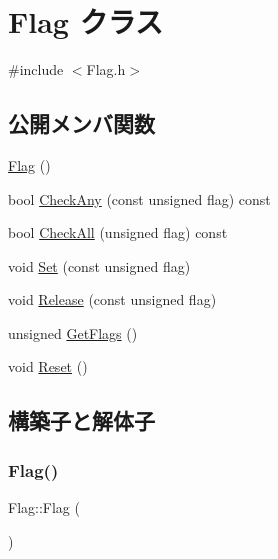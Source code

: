 \hypertarget{class_flag}{}\section{Flag クラス}
\label{class_flag}


{\ttfamily \#include $<$Flag.\+h$>$}

\subsection*{公開メンバ関数}
\begin{DoxyCompactItemize}
\item 
\mbox{\hyperlink{class_flag_a50b074239c14091f2a0dc1f52f9ed230}{Flag}} ()
\item 
bool \mbox{\hyperlink{class_flag_a3efc58733cf4aae0ff1ab0752aa4c702}{Check\+Any}} (const unsigned flag) const
\item 
bool \mbox{\hyperlink{class_flag_ac2ff8a3589aeefcf2672304da6339351}{Check\+All}} (unsigned flag) const
\item 
void \mbox{\hyperlink{class_flag_a362d2f64c03c0b596004f3eba4cb14a3}{Set}} (const unsigned flag)
\item 
void \mbox{\hyperlink{class_flag_a69ac5240829e3f509c64ca28b2344b6d}{Release}} (const unsigned flag)
\item 
unsigned \mbox{\hyperlink{class_flag_a0a2b25c70f1a7d90cd90c595b37ffc2a}{Get\+Flags}} ()
\item 
void \mbox{\hyperlink{class_flag_aef13ac09901558208fa1d8b63549c2ae}{Reset}} ()
\end{DoxyCompactItemize}


\subsection{構築子と解体子}
\mbox{\label{class_flag_a50b074239c14091f2a0dc1f52f9ed230}} 
\subsubsection{\texorpdfstring{Flag()}{Flag()}}
{\footnotesize\ttfamily Flag\+::\+Flag (\begin{DoxyParamCaption}{ }\end{DoxyParamCaption})\hspace{0.3cm}{\ttfamily [inline]}}




